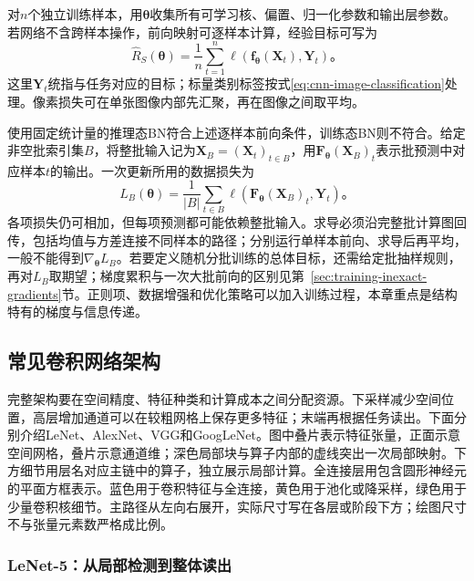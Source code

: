 对$n$个独立训练样本，用$\bm\theta$收集所有可学习核、偏置、归一化参数和输出层参数。若网络不含跨样本操作，前向映射可逐样本计算，经验目标可写为
\begin{equation}
  \widehat R_S(\bm\theta)=\frac1n\sum_{t=1}^{n}
    \ell\!\left(\bm f_{\bm\theta}(\bm X_t),\bm Y_t\right)\text{。}
  \label{eq:cnn-training-objective}
\end{equation}
这里$\bm Y_t$统指与任务对应的目标；标量类别标签按式\eqref{eq:cnn-image-classification}处理。像素损失可在单张图像内部先汇聚，再在图像之间取平均。

使用固定统计量的推理态BN符合上述逐样本前向条件，训练态BN则不符合。给定非空批索引集$B$，将整批输入记为$\bm X_B=(\bm X_t)_{t\in B}$，用$\bm F_{\bm\theta}(\bm X_B)_t$表示批预测中对应样本$t$的输出。一次更新所用的数据损失为
\begin{equation}
  L_B(\bm\theta)=\frac1{|B|}\sum_{t\in B}
    \ell\!\left(\bm F_{\bm\theta}(\bm X_B)_t,\bm Y_t\right)\text{。}
  \label{eq:cnn-batch-objective}
\end{equation}
各项损失仍可相加，但每项预测都可能依赖整批输入。求导必须沿完整批计算图回传，包括均值与方差连接不同样本的路径；分别运行单样本前向、求导后再平均，一般不能得到$\nabla_{\bm\theta}L_B$。若要定义随机分批训练的总体目标，还需给定批抽样规则，再对$L_B$取期望；梯度累积与一次大批前向的区别见第~\ref{sec:training-inexact-gradients}节。正则项、数据增强和优化策略可以加入训练过程，本章重点是结构特有的梯度与信息传递。

\FloatBarrier

\subsection{常见卷积网络架构}
\label{sec:cnn-classic-architectures}

完整架构要在空间精度、特征种类和计算成本之间分配资源。下采样减少空间位置，高层增加通道可以在较粗网格上保存更多特征；末端再根据任务读出。下面分别介绍LeNet、AlexNet、VGG和GoogLeNet。图中叠片表示特征张量，正面示意空间网格，叠片示意通道维；深色局部块与算子内部的虚线突出一次局部映射。下方细节用层名对应主链中的算子，独立展示局部计算。全连接层用包含圆形神经元的平面方框表示。蓝色用于卷积特征与全连接，黄色用于池化或降采样，绿色用于少量卷积核细节。主路径从左向右展开，实际尺寸写在各层或阶段下方；绘图尺寸不与张量元素数严格成比例。

\subsubsection{LeNet-5：从局部检测到整体读出}
\label{sec:cnn-lenet}

